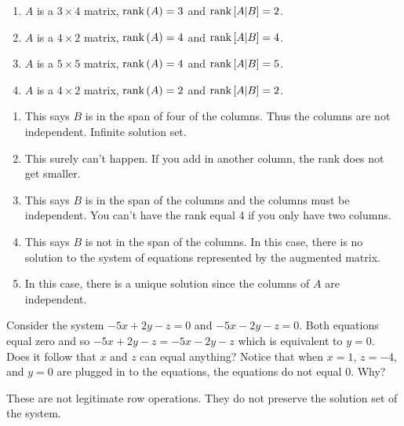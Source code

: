 \begin{enumialphparenastyle}
\begin{ex}
\begin{enumerate}
  \item $A$ is a $3\times 4$ matrix, $\mbox{\rm rank}\left(A\right) =3$ and 
    $\mbox{\rm rank}\left[A|B\right] =2$.
    
  \item $A$ is a $4\times 2$ matrix, $\mbox{\rm rank}\left(A\right) =4$ and 
    $\mbox{\rm rank}\left[A|B \right] =4$. 
    
  \item $A$ is a $5\times 5$ matrix, $\mbox{\rm rank}\left(A\right) =4$ and 
    $\mbox{\rm rank}\left[A|B \right] =5$. 
    
  \item $A$ is a $4\times 2$ matrix, $\mbox{\rm rank}\left(A\right) =2$ and 
    $\mbox{\rm rank}\left[A|B \right] =2$.
  \end{enumerate}
  
  \begin{sol}
    \begin{enumerate}
    \item This says $B$ is in the span of four of the columns. Thus the columns are not independent. Infinite solution set.
    \item This surely can't happen. If you add in another column, the rank does not get smaller.
    \item This says $B$ is in the span of the columns and the columns must be
      independent. You can't have the rank equal 4 if you only have two columns.
    \item This says $B$ is not in the span of the columns. In this case, there is no solution to the system of equations represented by the augmented matrix.
    \item In this case, there is a
      unique solution since the columns of $A$ are independent.
    \end{enumerate}
  \end{sol}
\end{ex}

\begin{ex} Consider the system $-5x+2y-z=0$ and $-5x-2y-z=0$. Both equations
equal zero and so $-5x+2y-z=-5x-2y-z$ which is equivalent to $y=0$. Does it follow that $x$
and $z$ can equal anything?  Notice that when $x=1$, $z=-4$, and $y=0$ are plugged in
to the equations, the equations do not equal $0$. Why?
\begin{sol}
These are not legitimate row
operations. They do not preserve the solution set of the system.
\end{sol}
\end{ex}

\end{enumialphparenastyle}
